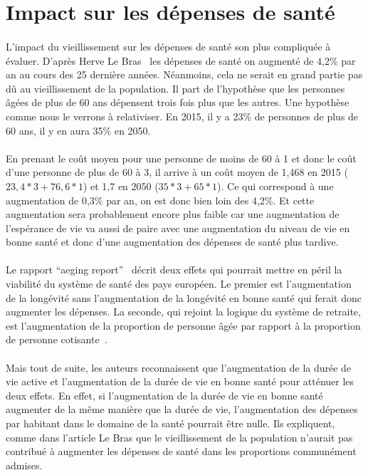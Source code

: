 \section{Impact sur les dépenses de santé}
\paragraph{}L’impact du vieillissement sur les dépenses de santé son plus compliquée à évaluer. D’après Herve Le Bras~\citep[pp.31]{heran} les dépenses de santé on augmenté de 4,2\% par an au cours des 25 dernière années. Néanmoins, cela ne serait en grand partie pas dû au vieillissement de la population.  Il part de l’hypothèse que les personnes âgées de plus de 60 ans dépensent trois fois plus que les autres. Une hypothèse comme nous le verrons à relativiser. En 2015, il y a 23\% de personnes de plus de 60 ans, il y en aura 35\% en 2050.


\paragraph{}En prenant le coût moyen pour une personne de moins de 60 à 1 et donc le coût d’une personne de plus de 60 à 3, il arrive à un coût moyen de 1,468 en 2015 ($23,4 * 3 + 76,6 * 1$) et 1,7 en 2050 ($35 * 3 + 65 *1$). Ce qui correspond à une augmentation de 0,3\% par an, on est donc bien loin des 4,2\%. Et cette augmentation sera probablement encore plus faible car une augmentation de l’espérance de vie va aussi de paire avec une augmentation du niveau de vie en bonne santé et donc d’une augmentation des dépenses de santé plus tardive. 

\paragraph{}Le rapport “aeging report”~\citep{ageing} décrit deux effets qui pourrait mettre en péril la viabilité du système de santé des pays européen. Le premier est l’augmentation de la longévité sans l’augmentation de la longévité en bonne santé qui ferait donc augmenter les dépenses. La seconde, qui rejoint la logique du système de retraite, est l’augmentation de la proportion de personne âgée par rapport à la proportion de personne cotisante~\citep[pp.116]{ageing}.   

\paragraph{}Mais tout de suite, les auteurs reconnaissent que l’augmentation de la durée de vie active et l’augmentation de la durée de vie en bonne santé pour atténuer les deux effets. En effet, si l’augmentation de la durée de vie en bonne santé augmenter de la même manière que la durée de vie, l’augmentation des dépenses par habitant dans le domaine de la santé pourrait être nulle.  Ils expliquent, comme dans l’article Le Bras que le vieillissement de la population n’aurait pas contribué à augmenter les dépenses de santé dans les proportions communément admises.~\citep[pp.116]{ageing} 

